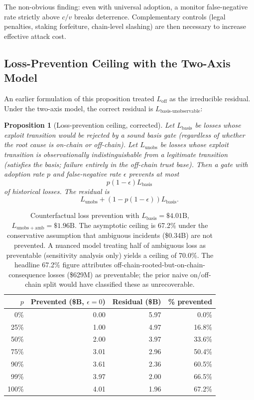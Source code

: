 \documentclass[11pt,a4paper]{article}
\newtheorem{proposition}[theorem]{Proposition}
\begin{document}
The non-obvious finding: even with universal adoption, a monitor false-negative rate strictly above $c/v$ breaks deterrence. Complementary controls (legal penalties, staking forfeiture, chain-level slashing) are then necessary to increase effective attack cost.

\subsection{Loss-Prevention Ceiling with the Two-Axis Model}

An earlier formulation of this proposition treated $L_{\mathrm{off}}$ as the irreducible residual. Under the two-axis model, the correct residual is $L_{\mathrm{basis\text{-}unobservable}}$:

\begin{proposition}[Loss-prevention ceiling, corrected]\label{prop:loss-ceiling}
Let $L_{\mathrm{basis}}$ be losses whose exploit transition would be rejected by a sound basis gate (regardless of whether the root cause is on-chain or off-chain). Let $L_{\mathrm{unobs}}$ be losses whose exploit transition is observationally indistinguishable from a legitimate transition (satisfies the basis; failure entirely in the off-chain trust base). Then a gate with adoption rate $p$ and false-negative rate $\epsilon$ prevents at most
\[
p(1-\epsilon) L_{\mathrm{basis}}
\]
of historical losses. The residual is
\[
L_{\mathrm{unobs}} + (1 - p(1-\epsilon)) L_{\mathrm{basis}}.
\]
\end{proposition}

\begin{table}[t]
\centering
\begin{tabular}{rrrr}
\toprule
$p$ & Prevented (\$B, $\epsilon=0$) & Residual (\$B) & \% prevented \\
\midrule
0\%   & 0.00 & 5.97 & 0.0\% \\
25\%  & 1.00 & 4.97 & 16.8\% \\
50\%  & 2.00 & 3.97 & 33.6\% \\
75\%  & 3.01 & 2.96 & 50.4\% \\
90\%  & 3.61 & 2.36 & 60.5\% \\
99\%  & 3.97 & 2.00 & 66.5\% \\
100\% & 4.01 & 1.96 & 67.2\% \\
\bottomrule
\end{tabular}
\caption{Counterfactual loss prevention with $L_{\mathrm{basis}} = \$4.01\text{B}$, $L_{\mathrm{unobs+amb}} = \$1.96\text{B}$. The asymptotic ceiling is 67.2\% under the conservative assumption that ambiguous incidents (\$0.34B) are not prevented. A nuanced model treating half of ambiguous loss as preventable (sensitivity analysis only) yields a ceiling of 70.0\%. The headline 67.2\% figure attributes off-chain-rooted-but-on-chain-consequence losses (\$629M) as preventable; the prior naive on/off-chain split would have classified these as unrecoverable.}\label{tab:loss-ceiling}
\end{table}
\end{document}
